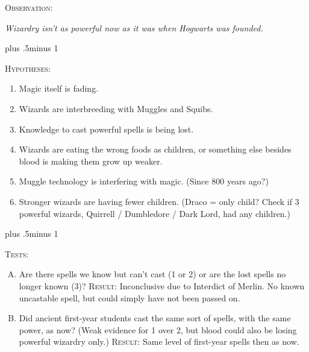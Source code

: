 \begin{centering}
\begin{samepage}
\scshape Observation:

\itshape Wizardry isn’t as powerful now as it was when Hogwarts was founded.
\end{samepage}

\baselineskip plus .5\textheight minus 1\baselineskip

\begin{samepage}
\scshape Hypotheses:

\itshape
        \begin{enumerate}[1.]
                \firmlist
                \setlength{\leftmargin}{\parindent}
                \setlength{\rightmargin}{\parindent}
        \item Magic itself is fading.
        \item Wizards are interbreeding with Muggles and Squibs.
        \item Knowledge to cast powerful spells is being lost.
        \item Wizards are eating the wrong foods as children, or something else besides blood is making them grow up weaker.
        \item Muggle technology is interfering with magic. (Since 800 years ago?)
        \item Stronger wizards are having fewer children. (Draco = only child? Check if 3 powerful wizards, Quirrell / Dumbledore / Dark Lord, had any children.)
        \end{enumerate}
\end{samepage}

\baselineskip plus .5\textheight minus 1\baselineskip

\begin{samepage}
\scshape Tests:
\itshape
        \begin{enumerate}[A.]{
                \firmlist
                \setlength{\leftmargin}{\parindent}
                \setlength{\rightmargin}{1cm}}
        \item Are there spells we know but can’t cast (1 or 2) or are the lost spells no longer known (3)? {\scshape Result:} Inconclusive due to Interdict of Merlin. No known uncastable spell, but could simply have not been passed on.

        \item Did ancient first-year students cast the same sort of spells, with the same power, as now? (Weak evidence for 1 over 2, but blood could also be losing powerful wizardry only.) {\scshape Result:} Same level of first-year spells then as now.


\end{enumerate}
\end{samepage}
\end{centering}
